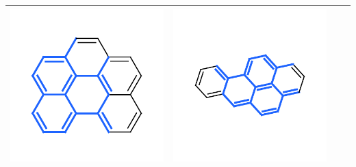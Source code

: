 \documentclass[landscape,a0b,final,a4resizeable]{include/a0poster}
\begin{document}
\begin{poster}
\begin{multicols}{3}
\begin{center}
\begin{tabular}{>{\centering}m{\mywidthb} >{\centering}m{\mywidtha} >{\centering}m{\mywidtha} >{\centering\arraybackslash}m{\mywidtha}}
\includegraphics[width=\mywidtha, clip, trim = 2mm 3mm 2mm 6mm]{figures/fig_9.pdf} &
\includegraphics[width=\mywidtha, clip, trim = 2mm 3mm 2mm 6mm]{figures/fig_10.pdf} \\
\midrule

\end{tabular}
\end{center}
\end{multicols}
\end{poster}
\end{document}
